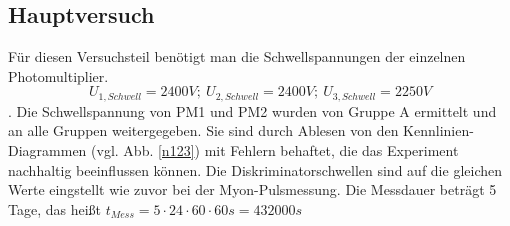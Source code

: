     \subsection{Hauptversuch}
        Für diesen Versuchsteil benötigt man die Schwellspannungen der einzelnen Photomultiplier. $$ U_{1,Schwell} = 2400\unit{V};\ U_{2,Schwell} = 2400\unit{V};\ U_{3,Schwell} = 2250\unit{V} $$. Die Schwellspannung von PM1 und PM2 wurden von Gruppe A ermittelt und an alle Gruppen weitergegeben. Sie sind durch Ablesen von den Kennlinien-Diagrammen (vgl. Abb. \ref{n123}) mit Fehlern behaftet, die das Experiment nachhaltig beeinflussen können.
        Die Diskriminatorschwellen sind auf die gleichen Werte eingstellt wie zuvor bei der Myon-Pulsmessung.
        Die Messdauer beträgt 5 Tage, das heißt $t_{Mess} = 5\cdot24\cdot60\cdot60\unit{s} = 432000\unit{s}$